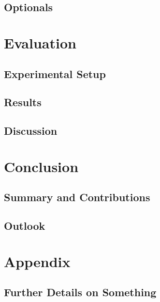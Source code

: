 \documentclass[%
  a4paper,fontsize=11pt,abstract=on,%
  twoside,BCOR=19mm,%
]{scrreprt}
\begin{document}
\section{Optionals}
\lipsum[1-3]



\chapter{Evaluation}\label{ch:eval}
\lipsum[1]
\section{Experimental Setup}
\lipsum[1-3]
\section{Results}
\lipsum[1-3]
\section{Discussion}
\lipsum[1-3]



\chapter{Conclusion}\label{ch:conclusion}
\lipsum[1]
\section{Summary and Contributions}
\lipsum[1-3]
\section{Outlook}
\lipsum[1-3]



\appendix
\chapter{Appendix}
\section{Further Details on Something}
\lipsum



\printbibliography


\end{document}
